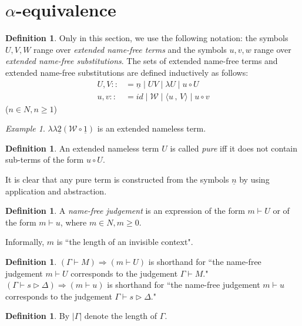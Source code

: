\documentclass[11pt]{amsart}
\theoremstyle{plain}
\theoremstyle{definition}
\newtheorem{definition}[theorem]{Definition}
\theoremstyle{remark}
\newtheorem{example}[theorem]{Example}
\numberwithin{equation}{section}
\newcommand{\tri}{\triangleright}
\newcommand{\ci}{\circ}
\newcommand{\mi}{\,,\,}
\renewcommand{\pi}{\mathcal{W}}
\begin{document}
\section{$\alpha$-equivalence}
\begin{definition} Only in this section, we use the following notation: the symbols $U,V,W$ range over \emph{extended
name-free terms} and the symbols $u,v,w$ range over \emph{extended
name-free substitutions}. The sets of extended name-free terms and
extended name-free substitutions are defined inductively as
follows:
\begin{align*}
U,V::&= \underline{n} \mid UV \mid \lambda U \mid u\ci U \\
u,v::&= id \mid \pi \mid \langle u\mi V \rangle \mid u\ci v
\end{align*}
($n\in N, n\geqslant 1$)
\end{definition}
\begin{example}$\lambda\lambda\underline{2}(\pi\ci\underline{1})$
is an extended nameless term.
\end{example}
\begin{definition}An extended nameless term $U$ is called \emph{pure} iff it does
not contain sub-terms of the form $u\ci U$.
\end{definition}
It is clear that any pure term is constructed from the symbols
$\underline{n}$ by  using application and  abstraction.
\begin{definition}A \emph{name-free judgement} is an expression of the
form $m\vdash U$ or of the form $m\vdash u$, where $m\in
N,m\geqslant 0$.
\end{definition}
Informally, $m$ is ``the length of an invisible context".
\begin{definition} $(\Gamma\vdash
M)\Rightarrow(m\vdash U)$ is shorthand for ``the name-free
judgement $m\vdash U$
 corresponds to the  judgement $\Gamma\vdash M$." \\
$(\Gamma\vdash s\tri\Delta)\Rightarrow(m\vdash u)$ is shorthand
for ``the
 name-free judgement $m\vdash u$  corresponds to the
judgement $\Gamma\vdash s\tri\Delta$."
\end{definition}
\begin{definition}By $|\Gamma|$ denote the length of $\Gamma$.
\end{definition}
\end{document}
